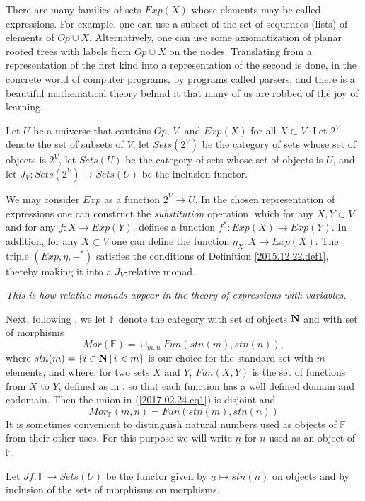\documentclass[12pt]{amsart}
\newenvironment{eq}{\begin{equation}}{\end{equation}}
\newcommand{\llabel}[1]{\label{#1}}
\newcommand{\sr}{\rightarrow}
\newcommand{\nn}{{\bf N\rm}}
\newcommand{\nat}{\nn}
\newcommand{\uu}{\underline}
\newcommand{\mbind}[1]{{#1^*}}
\newcommand{\FF}{{\mathbb F}}
\newcommand{\ff}[1]{\uu{#1}}
\begin{document}
There are many families of sets $Exp(X)$ whose elements may be called
expressions. For example, one can use a subset of the set of sequences (lists)
of elements of $Op\cup X$. Alternatively, one can use some axiomatization of
planar rooted trees with labels from $Op\cup X$ on the nodes. Translating from
a representation of the first kind into a representation of the second is done,
in the concrete world of computer programs, by programs called parsers, and there
is a beautiful mathematical theory behind it that many of us are robbed of the
joy of learning.

Let $U$ be a universe that contains $Op$, $V$, and $Exp(X)$ for all $X\subset V$.
Let $2^V$ denote the set of subsets of $V$,
let $Sets(2^V)$ be the category of sets whose set of objects is $2^V$, let
$Sets(U)$ be the category of sets whose set of objects is $U$, and let
$J_V:Sets(2^V)\sr Sets(U)$ be the inclusion functor.

We may consider $Exp$ as a function $2^V\sr U$. In the chosen representation of
expressions one can construct the {\em substitution} operation, which for any
$X,Y\subset V$ and for any $f:X\sr Exp(Y)$, defines a function $\mbind{f}:Exp(X)\sr
Exp(Y)$. In addition, for any $X\subset V$ one can define the function
$\eta_{X}:X\sr Exp(X)$. The triple $(Exp,\eta,\mbind{-})$ satisfies the
conditions of Definition \ref{2015.12.22.def1}, thereby making it into a $J_V$-relative
monad.

{\em This is how relative monads appear in the theory of expressions with variables.}

Next, following \cite{FPT}, we let $\FF$ denote the category with set of
objects $\nat$ and with set of morphisms
%
\begin{eq}
\llabel{2017.02.24.eq1}
Mor(\FF)=\cup_{m,n}Fun(stn(m),stn(n)),
\end{eq}%
%
where $stn(m)=\{i\in\nat\,|\,i<m\}$ is our choice for the standard set with $m$
elements, and where, for two sets $X$ and $Y$, $Fun(X,Y)$ is the set of functions
from $X$ to $Y$, defined as in \cite[p.~81]{Bourbaki.Sets}, so that each
function has a well defined domain and codomain. Then the union in
(\ref{2017.02.24.eq1}) is disjoint and
%
$$Mor_{\FF}(m,n)=Fun(stn(m),stn(n))$$
%
It is sometimes convenient to distinguish natural numbers used as objects of
$\FF$ from their other uses. For this purpose we will write $\ff{n}$ for $n$
used as an object of $\FF$.

Let $Jf:\FF\sr Sets(U)$ be the functor given by $\ff{n}\mapsto stn(n)$ on
objects and by inclusion of the sets of morphisms on morphisms.
\end{document}
